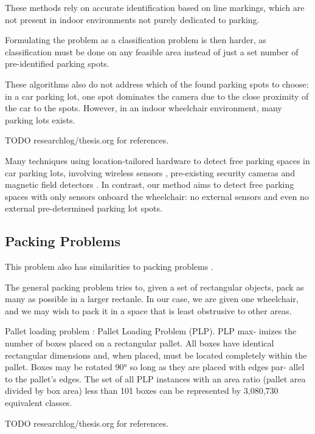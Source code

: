 These methods rely on accurate identification based on line markings, which are
not present in indoor environments not purely dedicated to parking. 

Formulating the problem as a classification problem is then harder, as
classification must be done on any feasible area instead of just a set number of
pre-identified parking spots.

These algorithms also do not address which of the found parking spots to choose:
in a car parking lot, one spot dominates the camera due to the close proximity
of the car to the spots. However, in an indoor wheelchair environment, many
parking lots exists.

TODO researchlog/thesis.org for references.

Many techniques using location-tailored hardware to detect free parking spaces
in car parking lots, involving wireless sensors \cite{panja2011wirelessly},
pre-existing security cameras \cite{true2007vacant} and magnetic field detectors
\cite{boda2007design}. In contrast, our method aims to detect free parking
spaces with only sensors onboard the wheelchair: no external sensors and even no
external pre-determined parking lot spots.


\subsection{Packing Problems}
This problem also has similarities to packing problems \cite{dyckhoff1990typology}.

The general packing
problem tries to, given a set of rectangular objects, pack as many as possible
in a larger rectanle. In our case, we are given one wheelchair, and we may wish
to pack it in a space that is least obstrusive to other areas.

Pallet loading problem \cite{martins2008solving}:
Pallet Loading Problem (PLP). PLP max- imizes the number of boxes placed on a
rectangular pallet. All boxes have identical rectangular dimensions and, when
placed, must be located completely within the pallet. Boxes may be rotated 90°
so long as they are placed with edges par- allel to the pallet’s edges. The set
of all PLP instances with an area ratio (pallet area divided by box area) less
than 101 boxes can be represented by 3,080,730 equivalent classes.


TODO researchlog/thesis.org for references.


